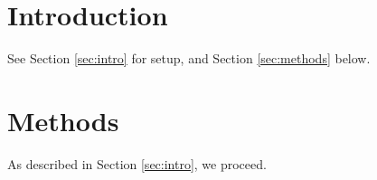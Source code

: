 \section{Introduction \label{sec:intro}}

See Section \ref{sec:intro} for setup, and Section \ref{sec:methods} below.

\section{Methods \label{sec:methods}}

As described in Section \ref{sec:intro}, we proceed.


